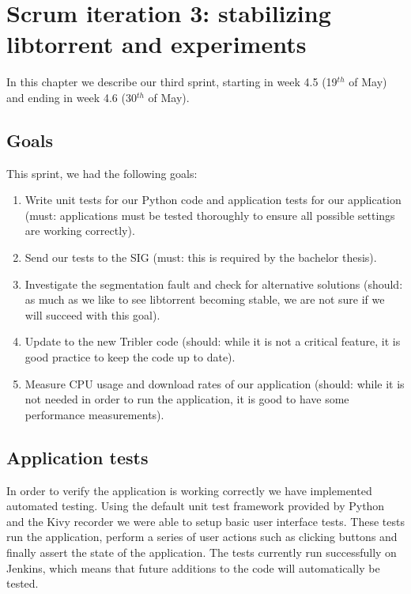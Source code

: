 \chapter{Scrum iteration 3: stabilizing libtorrent and experiments}
\label{cpt:iteration3}
	In this chapter we describe our third sprint, starting in week 4.5 (19$^{th}$ of May) and ending in week 4.6 (30$^{th}$ of May).

	\section{Goals}
		This sprint, we had the following goals:
	
		\begin{enumerate}
			\item Write unit tests for our Python code and application tests for our application (must: applications must be tested thoroughly to ensure all possible settings are working correctly). 
			\item Send our tests to the SIG (must: this is required by the bachelor thesis).
			\item Investigate the segmentation fault and check for alternative solutions (should: as much as we like to see libtorrent becoming stable, we are not sure if we will succeed with this goal).
			\item Update to the new Tribler code (should: while it is not a critical feature, it is good practice to keep the code up to date).
			\item Measure CPU usage and download rates of our application (should: while it is not needed in order to run the application, it is good to have some performance measurements).
		\end{enumerate}
		
	\section{Application tests}
		In order to verify the application is working correctly we have implemented automated testing. Using the default unit test framework provided by Python and the Kivy recorder we were able to setup basic user interface tests. These tests run the application, perform a series of user actions such as clicking buttons and finally assert the state of the application. The tests currently run successfully on Jenkins, which means that future additions to the code will automatically be tested.
		
